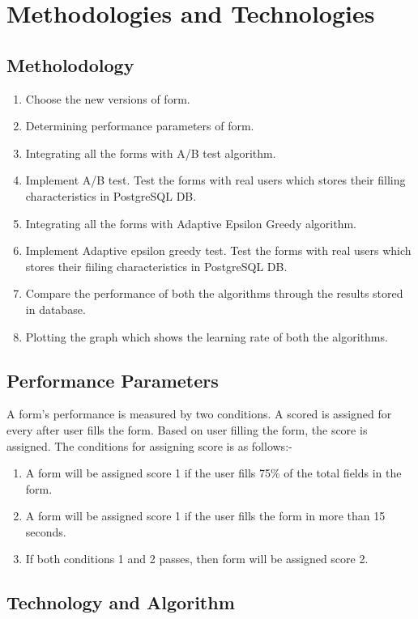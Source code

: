 \documentclass[12pt]{report}
\begin{document}
\chapter{Methodologies and Technologies}
\section{Metholodology}
\begin{enumerate}
\item Choose the new versions of form.
\item Determining performance parameters of form.
\item Integrating all the forms with A/B test algorithm.
\item Implement A/B test. Test the forms with real users which stores their filling characteristics in PostgreSQL DB.
\item Integrating all the forms with Adaptive Epsilon Greedy algorithm.
\item Implement Adaptive epsilon greedy test. Test the forms with real users which stores their fiiling characteristics in PostgreSQL DB.
\item Compare the performance of both the algorithms through the results stored in database. 
\item Plotting the graph which shows the learning rate of both the algorithms.
\end{enumerate}

\section{Performance Parameters}
A form’s performance is measured by two conditions. A scored is assigned for every after user fills the form. Based on user filling the form, the score is assigned. The conditions for assigning score is as follows:-
\begin{enumerate}
\item A form will be assigned score 1 if the user fills 75\% of the total fields in the form.
\item A form will be assigned score 1 if the user fills the form in more than 15 seconds.
\item If both conditions 1 and 2 passes, then form will be assigned score 2.
\end{enumerate}

\section{Technology and Algorithm}
\end{document}
